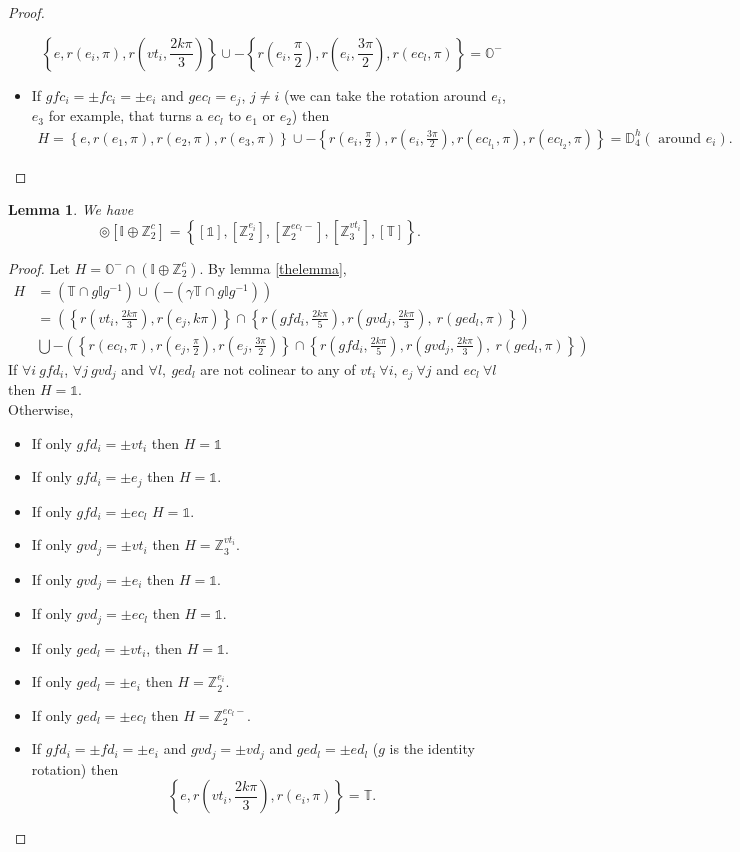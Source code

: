 \documentclass[11pt,a4paper]{amsart}
\newtheorem{lem}[thm]{Lemma}
\theoremstyle{definition}
\newcommand{\ZZ}{\mathbb{Z}}                %
\newcommand{\octa}{\mathbb{O}}              %
\newcommand{\ico}{\mathbb{I}}               %
\newcommand{\tetra}{\mathbb{T}}             %
\newcommand{\DD}{\mathbb{D}}                %
\newcommand{\1}{\mathds{1}}		            %
\newcommand{\set}[1]{\left\{#1\right\}}     %
\begin{document}
\begin{proof}
\begin{itemize}
\begin{equation*}
\set{e,r(e_i,\pi),r(vt_i,\frac{2k\pi}{3})}\cup-\set{r(e_i,\frac{\pi}{2}),r(e_i,\frac{3\pi}{2}),r(ec_l,\pi)}=\octa^-
\end{equation*}
\item If $gfc_i=\pm fc_i=\pm e_i$ and $gec_l=e_j$, $j\neq i$ (we can take the rotation around $e_i$, $e_3$ for example, that turns a $ec_l$ to $e_1$ or $e_2$) then
    \begin{align*}
	H=\set{e,r(e_1,\pi),r(e_2,\pi),r(e_3,\pi)}\cup -\set{r(e_i,\frac{\pi}{2}),r(e_i,\frac{3\pi}{2}),r(ec_{l_1},\pi),r(ec_{l_2},\pi)}
=\DD_4^h (\text{ around } e_i).
	\end{align*}
\end{itemize}
\end{proof}

\begin{lem}
We have
\begin{equation*}
[\octa^-] \circledcirc
 [\ico \oplus \ZZ_2^c]=\set{[\1],[\ZZ_2^{e_i}],[\ZZ_2^{ec_l-}],[\ZZ_3^{vt_i}],[\tetra]}.
\end{equation*}
\end{lem}
\begin{proof}
Let $H=\octa^- \cap (\ico \oplus \ZZ_2^c)$.
By lemma \ref{thelemma},
\begin{align*}
H&=(\tetra\cap g \ico g^{-1})\cup (-(\gamma\tetra\cap g \ico g^{-1}))\\
&=\left(\set{r(vt_i,\frac{2k\pi}{3}),r(e_j,k\pi)}\cap \set{r(gfd_i,\frac{2k\pi}{5}),r(gvd_j,\frac{2k\pi}{3}),\ r(ged_l,\pi)}\right)\\
&\bigcup-\left(\set{r(ec_l,\pi),r(e_j,\frac{\pi}{2}),r(e_j,\frac{3\pi}{2})}\cap \set{r(gfd_i,\frac{2k\pi}{5}),r(gvd_j,\frac{2k\pi}{3}),\ r(ged_l,\pi)}\right)
\end{align*}
If $\forall i\ gfd_i$, $\forall j \ gvd_j$ and $\forall l,\ ged_l$ are not colinear to any of $vt_i\ \forall i$, $e_j\ \forall j$ and $ec_l\ \forall l$ then $H=\1$.\\
Otherwise,
\begin{itemize}
\item If only $gfd_i=\pm vt_i$ then $H=\1$
\item If only $gfd_i=\pm e_j$ then $H=\1$.
\item If only $gfd_i=\pm ec_l$ $H=\1$.
\item If only $gvd_j=\pm vt_i$ then $H=\ZZ_3^{vt_i}$.
\item If only $gvd_j=\pm e_i$ then $H=\1$.
\item If only $gvd_j=\pm ec_l$ then $H=\1$.
\item If only $ged_l=\pm vt_i$, then $H=\1$.
\item If only $ged_l=\pm e_i$ then $H=\ZZ_2^{e_i}.$
\item If only $ged_l=\pm ec_l$ then $H=\ZZ_2^{ec_l-}.$
\item If $gfd_i=\pm fd_i=\pm e_i$ and $gvd_j=\pm vd_j$ and $ged_l=\pm ed_l$ ($g$ is the identity rotation) then
\begin{equation*}
\set{e,r(vt_i,\frac{2k\pi}{3}),r(e_i,\pi)}=\tetra.
\end{equation*}
\end{itemize}
\end{proof}
\end{document}
